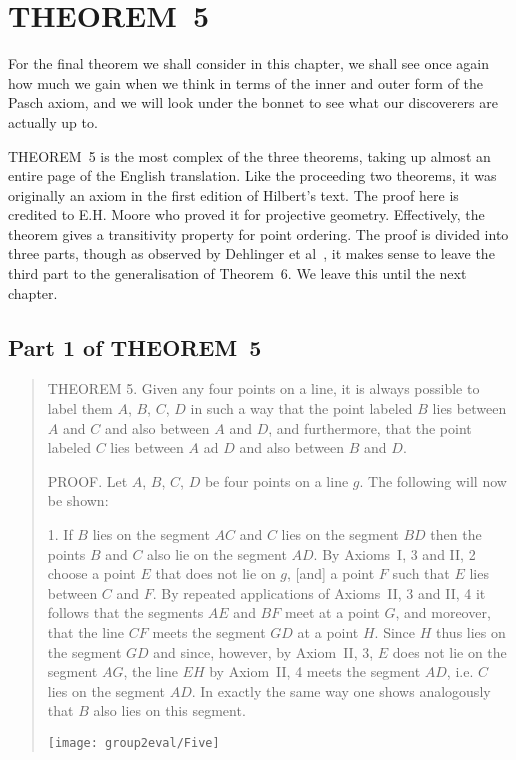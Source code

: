 \section{THEOREM~5}\label{sec:Theorem5}
For the final theorem we shall consider in this chapter, we shall see once again how much we gain when we think in terms of the inner and outer form of the Pasch axiom, and we will look under the bonnet to see what our discoverers are actually up to.

THEOREM~5 is the most complex of the three theorems, taking up almost an entire page of the English translation. Like the proceeding two theorems, it was originally an axiom in the first edition of Hilbert's text. The proof here is credited to E.H. Moore who proved it for projective geometry. Effectively, the theorem gives a transitivity property for point ordering. The proof is divided into three parts, though as observed by Dehlinger et al~\cite{DehlingerFOG}, it makes sense to leave the third part to the generalisation of Theorem~6. We leave this until the next chapter.

\subsection{Part 1 of THEOREM~5}
\begin{quote}
THEOREM 5. Given any four points on a line, it is always possible to label them $A$, $B$, $C$, $D$ in such a way that the point labeled $B$ lies between $A$ and $C$ and also between $A$ and $D$, and furthermore, that the point labeled $C$ lies between $A$ ad $D$ and also between $B$ and $D$.

PROOF. Let $A$, $B$, $C$, $D$ be four points on a line $g$. The following will now be shown:

1. If $B$ lies on the segment $AC$ and $C$ lies on the segment $BD$ then the points $B$ and $C$ also lie on the segment $AD$. By Axioms~I, 3 and II, 2 choose a point $E$ that does not lie on $g$, [and] a point $F$ such that $E$ lies between $C$ and $F$. By repeated applications of Axioms~II, 3 and II, 4 it follows that the segments $AE$ and $BF$ meet at a point $G$, and moreover, that the line $CF$ meets the segment $GD$ at a point $H$. Since $H$ thus lies on the segment $GD$ and since, however, by Axiom~II, 3, $E$ does not lie on the segment $AG$, the line $EH$ by Axiom~II, 4 meets the segment $AD$, i.e. $C$ lies on the segment $AD$. In exactly the same way one shows analogously that $B$ also lies on this segment.

\centering\texttt{[image: group2eval/Five]}
\end{quote}

